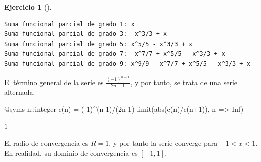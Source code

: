 \documentclass[
  a4paper,
]{scrreport}
\newenvironment{Shaded}{\begin{snugshade}}{\end{snugshade}}
\newcommand{\BuiltInTok}[1]{\textcolor[rgb]{0.00,0.23,0.31}{#1}}
\newcommand{\ConstantTok}[1]{\textcolor[rgb]{0.56,0.35,0.01}{#1}}
\newcommand{\ControlFlowTok}[1]{\textcolor[rgb]{0.00,0.23,0.31}{#1}}
\newcommand{\DataTypeTok}[1]{\textcolor[rgb]{0.68,0.00,0.00}{#1}}
\newcommand{\FloatTok}[1]{\textcolor[rgb]{0.68,0.00,0.00}{#1}}
\newcommand{\FunctionTok}[1]{\textcolor[rgb]{0.28,0.35,0.67}{#1}}
\newcommand{\ImportTok}[1]{\textcolor[rgb]{0.00,0.46,0.62}{#1}}
\newcommand{\NormalTok}[1]{\textcolor[rgb]{0.00,0.23,0.31}{#1}}
\newcommand{\OperatorTok}[1]{\textcolor[rgb]{0.37,0.37,0.37}{#1}}
\newcommand{\PreprocessorTok}[1]{\textcolor[rgb]{0.68,0.00,0.00}{#1}}
\newcommand{\SpecialCharTok}[1]{\textcolor[rgb]{0.37,0.37,0.37}{#1}}
\newcommand{\StringTok}[1]{\textcolor[rgb]{0.13,0.47,0.30}{#1}}
\theoremstyle{definition}
\newtheorem{exercise}{Ejercicio}[chapter]
\theoremstyle{remark}
\begin{document}
\begin{exercise}[]
\begin{tcolorbox}
\begin{Shaded}
\end{Shaded}

\begin{verbatim}
Suma funcional parcial de grado 1: x
Suma funcional parcial de grado 3: -x^3/3 + x
Suma funcional parcial de grado 5: x^5/5 - x^3/3 + x
Suma funcional parcial de grado 7: -x^7/7 + x^5/5 - x^3/3 + x
Suma funcional parcial de grado 9: x^9/9 - x^7/7 + x^5/5 - x^3/3 + x
\end{verbatim}

El término general de la serie es \(\frac{(-1)^{n-1}}{2n-1}\), y por
tanto, se trata de una serie alternada.

\begin{Shaded}
\begin{Highlighting}[]
\PreprocessorTok{@syms}\NormalTok{ n}\OperatorTok{::}\DataTypeTok{integer}
\FunctionTok{c}\NormalTok{(n) }\OperatorTok{=}\NormalTok{ (}\OperatorTok{{-}}\FloatTok{1}\NormalTok{)}\OperatorTok{\^{}}\NormalTok{(n}\OperatorTok{{-}}\FloatTok{1}\NormalTok{)}\OperatorTok{/}\NormalTok{(}\FloatTok{2}\NormalTok{n}\OperatorTok{{-}}\FloatTok{1}\NormalTok{)}
\FunctionTok{limit}\NormalTok{(}\FunctionTok{abs}\NormalTok{(}\FunctionTok{c}\NormalTok{(n)}\OperatorTok{/}\FunctionTok{c}\NormalTok{(n}\OperatorTok{+}\FloatTok{1}\NormalTok{)), n }\OperatorTok{=\textgreater{}} \ConstantTok{Inf}\NormalTok{)}
\end{Highlighting}
\end{Shaded}

$1$

El radio de convergencia es \(R=1\), y por tanto la serie converge para
\(-1<x<1\). En realidad, su dominio de convergencia es \([-1,1]\).


\end{tcolorbox}
\end{exercise}
\end{document}
